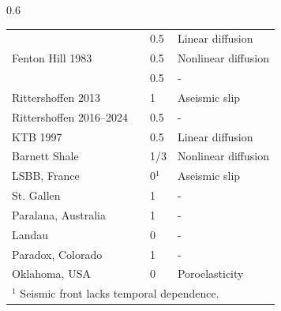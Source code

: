 \documentclass{beamer}
\begin{document}
\begin{frame}
\begin{columns}
\begin{column}{0.6\textwidth}
{\begin{tabular}{llll}
					\multirow{3}{*}{Fenton Hill 1983}
					     & \cite{ShapiroEtAl2002}   & 0.5      & Linear diffusion       \\
					     & \cite{HummelMller2009}   & 0.5      & Nonlinear diffusion    \\
					     & \cite{GoebelBrodsky2018} & 0.5      & -                      \\
					\midrule

					Rittershoffen 2013
					     & \cite{LenglineEtAl2017}  & 1        & Aseismic slip          \\
					Rittershoffen 2016--2024
					     & \cite{LenglineEtAl2025}  & 0.5      & -                      \\
					\midrule

					KTB 1997
					     & \cite{ShapiroEtAl1997}   & 0.5      & Linear diffusion       \\
					Barnett Shale
					     & \cite{ShapiroDinske2009} & 1/3      & Nonlinear diffusion    \\
					LSBB, France
					     & \cite{DuboeufEtAl2017}   & 0$^{1}$  & Aseismic slip          \\
					St. Gallen
					     & \cite{GoebelBrodsky2018} & 1        & -                      \\
					Paralana, Australia
					     & \cite{GoebelBrodsky2018} & 1        & -                      \\
					Landau
					     & \cite{GoebelBrodsky2018} & 0        & -                      \\
					Paradox, Colorado
					     & \cite{GoebelBrodsky2018} & 1        & -                      \\
					Oklahoma, USA
					     & \cite{GoebelEtAl2017}    & 0        & Poroelasticity         \\
					\midrule

					\multicolumn{4}{l}{$^{1}$ Seismic front lacks temporal dependence.} \\
					\bottomrule
				\end{tabular}
			}
		\end{column}
	\end{columns}
\end{frame}
\end{document}
